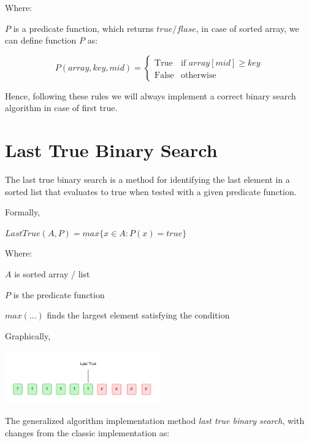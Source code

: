 \documentclass[10pt,twocolumn]{article}
\begin{document}
	\vspace{10pt}
	
	Where:
	
	\quad $P$ is a predicate function, which returns $true / flase$, in case of sorted array, we can define function $P$ as:

\[
P(array, key, mid) = 
\begin{cases} 
	\text{True} & \text{if } array[mid] \ge key \\ 
	\text{False} & \text{otherwise} 
\end{cases}
\]
	\vspace{5pt}
	
	Hence, following these rules we will always implement a correct binary search algorithm in case of first true.  
		 
	\section{Last True Binary Search}
	
		The last true binary search is a method for identifying the last element in a sorted list that evaluates to true when tested with a given predicate function.	
	
	\vspace{10pt}
	
	Formally, 
	
	\vspace*{5pt}
	$LastTrue(A, P) = max\{x \in A: P(x) = true\}$
	\vspace*{5pt}
	
	Where:
	
	\quad$A$ is sorted array / list
	
	\quad$P$ is the predicate function
	
	\quad$max(...)$ finds the largest element satisfying the condition
	
	
	
	\vspace{10pt}
	
	Graphically,
	
	\includegraphics[width=0.5\textwidth]{lasttrue.png}
	
	The generalized algorithm implementation method \emph{last true binary search}, with changes from the classic implementation as:
	
\end{document}
